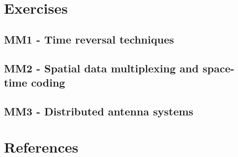 



    \singlespacing
    \pagestyle{empty}	
	
	\cleardoublepage
	
	\pagestyle{plain}
		
	\tableofcontents 
	\onehalfspacing
	\pagestyle{fancy} %
    \setcounter{page}{0} %

\part{Exercises}

\chapter{MM1 - Time reversal techniques}







\chapter{MM2 - Spatial data multiplexing and space-time coding}






\chapter{MM3 - Distributed antenna systems}









\part{References}



%


